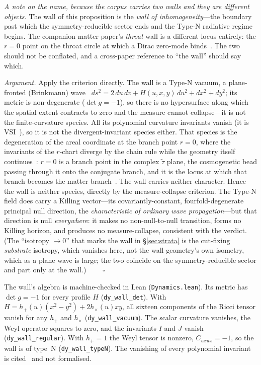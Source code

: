 \documentclass[11pt,a4paper]{article}
\theoremstyle{plain}
\theoremstyle{definition}
\theoremstyle{remark}
\begin{document}
\noindent\emph{A note on the name, because the corpus carries two walls and they are different objects.} The wall of this proposition is the \emph{wall of inhomogeneity}---the boundary past which the symmetry-reducible sector ends and the Type-N radiative regime begins. The companion matter paper's \emph{throat} wall is a different locus entirely: the $r=0$ point on the throat circle at which a Dirac zero-mode binds~\cite{JanzenMatter}. The two should not be conflated, and a cross-paper reference to ``the wall'' should say which.

\noindent\emph{Argument.} Apply the criterion directly. The wall is a Type-N vacuum, a plane-fronted (Brinkmann) wave~\cite{Brinkmann1925} $ds^2=2\,du\,dv+H(u,x,y)\,du^2+dx^2+dy^2$; its metric is non-degenerate ($\det g=-1$), so there is no hypersurface along which the spatial extent contracts to zero and the measure cannot collapse---it is not the finite-curvature species. All its polynomial curvature invariants vanish (it is VSI~\cite{PravdaVSI2002}), so it is not the divergent-invariant species either. That species is the degeneration of the areal coordinate at the branch point $r=0$, where the invariants of the $r$-chart diverge by the chain rule while the geometry itself continues~\cite{JanzenCircle}: $r=0$ is a branch point in the complex $\tilde\tau$ plane, the cosmogenetic bead passing through it onto the conjugate branch, and it is the locus at which that branch becomes the matter branch~\cite{JanzenSlicing,JanzenCRframework}. The wall carries neither character. Hence the wall is neither species, directly by the measure-collapse criterion. The Type-N field does carry a Killing vector---its covariantly-constant, fourfold-degenerate principal null direction, the \emph{characteristic of ordinary wave propagation}---but that direction is null \emph{everywhere}: it makes no non-null-to-null transition, forms no Killing horizon, and produces no measure-collapse, consistent with the verdict. (The ``isotropy $\to 0$'' that marks the wall in \S\ref{sec:strata} is the cut-fixing \emph{substrate} isotropy, which vanishes here, not the wall geometry's own isometry, which as a plane wave is large; the two coincide on the symmetry-reducible sector and part only at the wall.) $\qquad\square$

\noindent The wall's algebra is machine-checked in Lean (\texttt{Dynamics.lean}). Its metric has $\det g=-1$ for every profile $H$ (\texttt{dy\_wall\_det}). With $H=h_+(u)(x^{2}-y^{2})+2h_\times(u)xy$, all sixteen components of the Ricci tensor vanish for any $h_+$ and $h_\times$ (\texttt{dy\_wall\_vacuum}). The scalar curvature vanishes, the Weyl operator squares to zero, and the invariants $I$ and $J$ vanish (\texttt{dy\_wall\_regular}). With $h_+=1$ the Weyl tensor is nonzero, $C_{uxux}=-1$, so the wall is of type~N (\texttt{dy\_wall\_typeN}). The vanishing of every polynomial invariant is cited~\cite{PravdaVSI2002} and not formalised.
\end{document}
